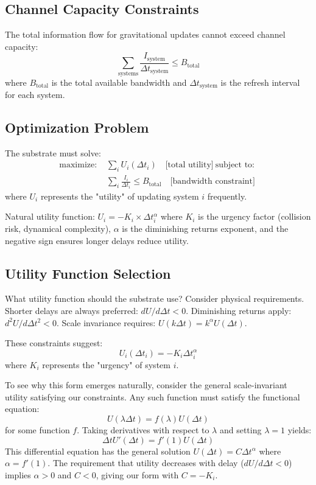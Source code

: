 \documentclass[twocolumn,prd,amsmath,amssymb,aps,superscriptaddress,nofootinbib]{revtex4-2}
\begin{document}
\subsection{Channel Capacity Constraints}

The total information flow for gravitational updates cannot exceed channel capacity:
\begin{equation}
\sum_{\text{systems}} \frac{I_{\text{system}}}{\Delta t_{\text{system}}} \leq B_{\text{total}}
\end{equation}
where $B_{\text{total}}$ is the total available bandwidth and $\Delta t_{\text{system}}$ is the refresh interval for each system.

\subsection{Optimization Problem}

The substrate must solve:
\begin{align}
\text{maximize: } & \sum_i U_i(\Delta t_i) \quad \text{[total utility]} \
\text{subject to: }\\ & \sum_i \frac{I_i}{\Delta t_i} \leq B_{\text{total}} \quad \text{[bandwidth constraint]}
\end{align}
where $U_i$ represents the "utility" of updating system $i$ frequently.

Natural utility function: $U_i = -K_i \times \Delta t_i^\alpha$ where $K_i$ is the urgency factor (collision risk, dynamical complexity), $\alpha$ is the diminishing returns exponent, and the negative sign ensures longer delays reduce utility.

\subsection{Utility Function Selection}

What utility function should the substrate use? Consider physical requirements. Shorter delays are always preferred: $dU/d\Delta t < 0$. Diminishing returns apply: $d^2U/d\Delta t^2 < 0$. Scale invariance requires: $U(k\Delta t) = k^\alpha U(\Delta t)$.

These constraints suggest:
\begin{equation}
U_i(\Delta t_i) = -K_i \Delta t_i^\alpha
\end{equation}
where $K_i$ represents the "urgency" of system $i$.

To see why this form emerges naturally, consider the general scale-invariant utility satisfying our constraints. Any such function must satisfy the functional equation:
\begin{equation}
U(\lambda \Delta t) = f(\lambda) U(\Delta t)
\end{equation}
for some function $f$. Taking derivatives with respect to $\lambda$ and setting $\lambda = 1$ yields:
\begin{equation}
\Delta t U'(\Delta t) = f'(1) U(\Delta t)
\end{equation}
This differential equation has the general solution $U(\Delta t) = C \Delta t^{\alpha}$ where $\alpha = f'(1)$. The requirement that utility decreases with delay ($dU/d\Delta t < 0$) implies $\alpha > 0$ and $C < 0$, giving our form with $C = -K_i$.
\end{document}
